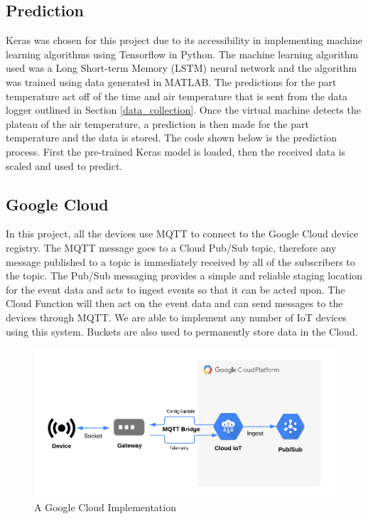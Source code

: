\documentclass{article}
\begin{document}
\subsection{Prediction}
Keras was chosen for this project due to its accessibility in implementing machine learning algorithms using Tensorflow in Python. The machine learning algorithm used was a Long Short-term Memory (LSTM) neural network and the algorithm was trained using data generated in MATLAB. The predictions for the part temperature act off of the time and air temperature that is sent from the data logger outlined in Section \ref{data_collection}. Once the virtual machine detects the plateau of the air temperature, a prediction is then made for the part temperature and the data is stored. The code shown below is the prediction process. First the pre-trained Keras model is loaded, then the received data is scaled and used to predict.  
 


\subsection{Google Cloud}
In this project, all the devices use MQTT to connect to the Google Cloud device registry. The MQTT message goes to a Cloud Pub/Sub topic, therefore any message published to a topic is immediately received by all of the subscribers to the topic. The Pub/Sub messaging provides a simple and reliable staging location for the event data and acts to ingest events so that it can be acted upon. The Cloud Function will then act on the event data and can send messages to the devices through MQTT. We are able to implement any number of IoT devices using this system. Buckets are also used to permanently store data in the Cloud. 
\begin{figure}[h]
    \centering
    \includegraphics[width=\linewidth]{gateway-arch.png}
    \caption{A Google Cloud Implementation}
    \label{fig:gcloud}
\end{figure}
\end{document}
